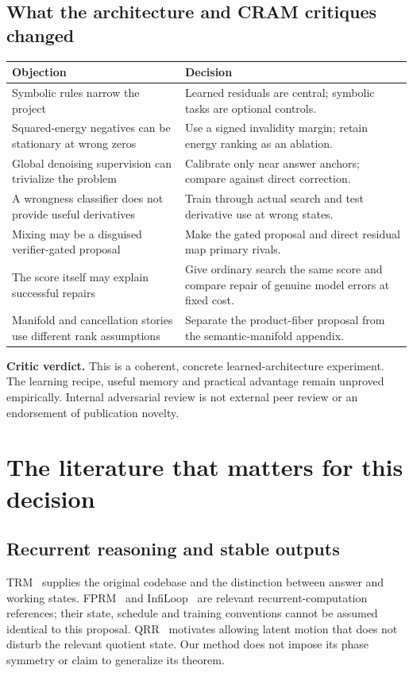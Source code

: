\documentclass[11pt,a4paper]{article}
\newcommand{\newtopic}{\clearpage}
\begin{document}
\subsection{What the architecture and CRAM critiques changed}
\begin{tabularx}{\linewidth}{@{}P{49mm}Y@{}}\toprule
Objection & Decision\\\midrule
Symbolic rules narrow the project & Learned residuals are central; symbolic tasks are optional controls.\\
Squared-energy negatives can be stationary at wrong zeros & Use a signed invalidity margin; retain energy ranking as an ablation.\\
Global denoising supervision can trivialize the problem & Calibrate only near answer anchors; compare against direct correction.\\
A wrongness classifier does not provide useful derivatives & Train through actual search and test derivative use at wrong states.\\
Mixing may be a disguised verifier-gated proposal & Make the gated proposal and direct residual map primary rivals.\\
The score itself may explain successful repairs & Give ordinary search the same score and compare repair of genuine model errors at fixed cost.\\
Manifold and cancellation stories use different rank assumptions & Separate the product-fiber proposal from the semantic-manifold appendix.\\\bottomrule
\end{tabularx}

\textbf{Critic verdict.} This is a coherent, concrete learned-architecture experiment. The learning recipe, useful memory and practical advantage remain unproved empirically. Internal adversarial review is not external peer review or an endorsement of publication novelty.

\newtopic
\section{The literature that matters for this decision}\label{sec:literature}
\subsection{Recurrent reasoning and stable outputs}
TRM~\cite{trm} supplies the original codebase and the distinction between answer and working states. FPRM~\cite{fprm} and InfiLoop~\cite{infiloop} are relevant recurrent-computation references; their state, schedule and training conventions cannot be assumed identical to this proposal. QRR~\cite{qrr} motivates allowing latent motion that does not disturb the relevant quotient state. Our method does not impose its phase symmetry or claim to generalize its theorem.
\end{document}
